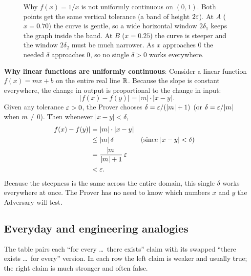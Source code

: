 \begin{figure}[htbp]
\caption{Why $f(x) = 1/x$ is not uniformly continuous on $(0, 1)$. Both points get the same vertical tolerance (a band of height $2\varepsilon$). At $A$ ($x = 0.70$) the curve is gentle, so a wide horizontal window $2\delta_1$ keeps the graph inside the band. At $B$ ($x = 0.25$) the curve is steeper and the window $2\delta_2$ must be much narrower. As $x$ approaches $0$ the needed $\delta$ approaches $0$, so no single $\delta > 0$ works everywhere.}
\label{fig:qo-one-over-x}
\end{figure}

\begin{intuitionbox}
\textbf{Why linear functions are uniformly continuous}:
Consider a linear function $f(x) = mx + b$ on the entire real line $\mathbb{R}$. Because the slope is constant everywhere, the change in output is proportional to the change in input:
\[
|f(x) - f(y)| = |m| \cdot |x - y|.
\]
Given any tolerance $\varepsilon > 0$, the Prover chooses $\delta = \varepsilon / (|m| + 1)$ (or $\delta = \varepsilon/|m|$ when $m \ne 0$). Then whenever $|x - y| < \delta$,
\begin{align*}
|f(x) - f(y)| &= |m| \cdot |x - y| \\
&\le |m|\,\delta && \text{(since } |x - y| < \delta\text{)} \\
&= \frac{|m|}{|m| + 1}\,\varepsilon \\
&< \varepsilon.
\end{align*}
Because the steepness is the same across the entire domain, this single $\delta$ works everywhere at once. The Prover has no need to know which numbers $x$ and $y$ the Adversary will test.
\end{intuitionbox}

\subsection{Everyday and engineering analogies}

The table pairs each ``for every \dots\ there exists'' claim with its swapped ``there exists \dots\ for every'' version. In each row the left claim is weaker and usually true; the right claim is much stronger and often false.

